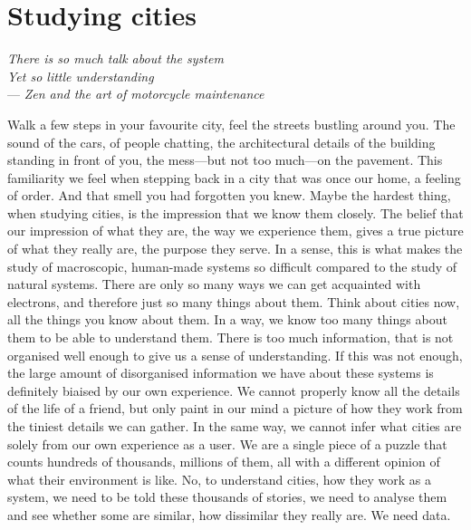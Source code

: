 \chapter{Studying cities}
\label{sec:studying_cities}

\begin{flushright}{\slshape    
There is so much talk about the system\\
Yet so little understanding} \\ \medskip
--- \emph{Zen and the art of motorcycle maintenance}
\end{flushright}
Walk a few steps in your favourite city, feel the streets bustling around you.
The sound of the cars, of people chatting, the architectural details of the
building standing in front of you, the mess---but not too much---on the
pavement. This familiarity we feel when stepping back in a city that was once
our home, a feeling of order. And that smell you had forgotten you knew. Maybe
the hardest thing, when studying cities, is the impression that we know them
closely. The belief that our impression of what they are, the way we experience
them, gives a true picture of what they really are, the purpose they serve. In a
sense, this is what makes the study of macroscopic, human-made systems so
difficult compared to the study of natural systems. There are only so many ways
we can get acquainted with electrons, and therefore just so many things about
them. Think about cities now, all the things you know about them. In a way, we
know too many things about them to be able to understand them. There is too much
information, that is not organised well enough to give us a sense of
understanding. If this was not enough, the large amount of disorganised
information we have about these systems is definitely biaised by our own
experience. We cannot properly know all the details of the life of a friend,
but only paint in our mind a picture of how they work from the tiniest details
we can gather. In the same way, we cannot infer what cities are solely from our
own experience as a user. We are a single piece of a puzzle that counts hundreds
of thousands, millions of them, all with a different opinion of what their
environment is like. No, to understand cities, how they work as a system, we
need to be told these thousands of stories, we need to analyse them and see
whether some are similar, how dissimilar they really are. We need data.\\

